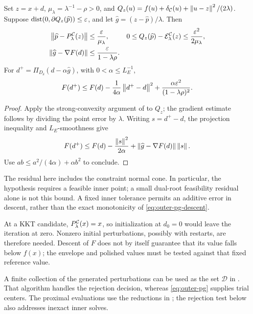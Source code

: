 \begin{lemma}
  \label{lem:inexact-envelope-step}
  Set \(z=x+d\), \(\mu_\lambda=\lambda^{-1}-\rho>0\), and
  \(Q_z(u)=f(u)+\delta_{\mathcal{C}}(u)+\left\lVert u-z\right\rVert^2/(2\lambda)\).
  Suppose \(\operatorname{dist}(0,\partial Q_z(\widehat p))\le\varepsilon\), and let
  \(\widehat g=(z-\widehat p)/\lambda\).  Then
  \begin{align}
    \left\lVert \widehat p-P_\lambda^{\mathcal{C}}(z)\right\rVert
      &\le\frac{\varepsilon}{\mu_\lambda},&
    0\le Q_z(\widehat p)-\mathcal{E}_\lambda^{\mathcal{C}}(z)
      &\le\frac{\varepsilon^2}{2\mu_\lambda},\nonumber\\
    \left\lVert \widehat g-\nabla F(d)\right\rVert
      &\le\frac{\varepsilon}{1-\lambda\rho}.
      \label{eq:inexact-envelope-gradient}
  \end{align}
  For \(d^+=\Pi_{D_\delta}(d-\alpha\widehat g)\), with
  \(0<\alpha\le L_E^{-1}\),
  \begin{equation}
    F(d^+)\le F(d)-\frac{1}{4\alpha}\left\lVert d^+-d\right\rVert^2
      +\frac{\alpha\varepsilon^2}{(1-\lambda\rho)^2}.
    \label{eq:inexact-envelope-descent}
  \end{equation}
\end{lemma}

\begin{proof}
  Apply the strong-convexity argument of 
  to \(Q_z\); the gradient estimate follows by dividing the point error
  by \(\lambda\).  Writing \(s=d^+-d\), the projection inequality and
  \(L_E\)-smoothness give
  \[
    F(d^+)\le F(d)-\frac{\left\lVert s\right\rVert^2}{2\alpha}
       +\left\lVert \widehat g-\nabla F(d)\right\rVert\left\lVert s\right\rVert.
  \]
  Use \(ab\le a^2/(4\alpha)+\alpha b^2\) to conclude.
\end{proof}

The residual here includes the constraint normal cone.  In particular,
the hypothesis requires a feasible inner point; a small dual-root
feasibility residual alone is not this bound.  A fixed inner tolerance
permits an additive error in descent, rather than the exact monotonicity
of \cref{eq:outer-pg-descent}.

At a KKT candidate, \(P_\lambda^{\mathcal{C}}(x)=x\), so initialization at
\(d_0=0\) would leave the iteration at zero.  Nonzero initial perturbations,
possibly with restarts, are therefore needed.  Descent of \(F\) does not by
itself guarantee that its value falls below \(f(x)\); the envelope and
polished values must be tested against that fixed reference value.

A finite collection of the generated perturbations can be used as the set
\(\mathcal D\) in .  That algorithm handles the
rejection decision, whereas \cref{eq:outer-pg} supplies trial centers.
The proximal evaluations use the reductions in ;
the rejection test below also addresses inexact inner solves.

